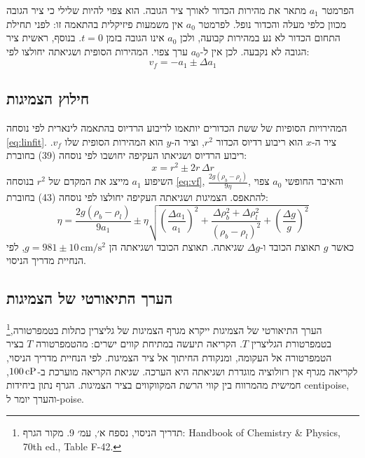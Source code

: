 \documentclass[10pt,a4paper]{article}
\makeatletter
\newcommand{\textenglish}[1]{\foreignlanguage{english}{#1}}
\newif\iffirstblue \firstbluetrue
\DeclareRobustCommand{\added}[1]{\ifx\@captype\@undefined\iffirstblue\global\firstbluefalse\hypertarget{firstblue}{}\label{firstblue}\fi\fi\textcolor{addedblue}{#1}}
\newcommand{\U}[1]{\,\mathrm{#1}}
\makeatother
\begin{document}
הפרמטר $a_1$ מתאר את מהירות הכדור לאורך ציר הגובה. הוא צפוי להיות שלילי כי ציר הגובה מכוון כלפי מעלה והכדור נופל. לפרמטר $a_0$ אין משמעות פיזיקלית בהתאמה זו: לפני תחילת התחום הכדור לא נע במהירות קבועה, ולכן $a_0$ אינו הגובה בזמן $t=0$. בנוסף, ראשית ציר הגובה לא נקבעה. לכן אין ל-$a_0$ ערך צפוי. המהירות הסופית ושגיאתה יחולצו לפי:
\begin{equation}\label{eq:vffit}
v_f = -a_1 \pm \Delta a_1
\end{equation}

\subsection*{חילוץ הצמיגות}
המהירויות הסופיות של ששת הכדורים יותאמו לריבוע הרדיוס בהתאמה לינארית לפי נוסחה \eqref{eq:linfit}. ציר ה-$x$ הוא ריבוע רדיוס הכדור $r^2$, וציר ה-$y$ הוא המהירות הסופית שלו $v_f$. ריבוע הרדיוס ושגיאתו העקיפה יחושבו לפי נוסחה (39) בחוברת:
\begin{equation}\label{eq:dr2}
x = r^2 \pm 2r\,\Delta r
\end{equation}
השיפוע $a_1$ מייצג את המקדם של $r^2$ בנוסחה \eqref{eq:vf}, $\frac{2g(\rho_b-\rho_l)}{9\eta}$, והאיבר החופשי $a_0$ צפוי להתאפס. הצמיגות ושגיאתה העקיפה יחולצו לפי נוסחה (43) בחוברת:
\begin{equation}\label{eq:eta}
\eta = \frac{2g(\rho_b-\rho_l)}{9a_1} \pm \eta\sqrt{\left(\frac{\Delta a_1}{a_1}\right)^2 + \frac{\Delta\rho_b^2+\Delta\rho_l^2}{(\rho_b-\rho_l)^2} + \left(\frac{\Delta g}{g}\right)^2}
\end{equation}
כאשר $g$ תאוצת הכובד ו-$\Delta g$ שגיאתה.
תאוצת הכובד ושגיאתה הן $g = 981 \pm 10\U{cm/s^2}$, לפי הנחיית מדריך הניסוי.

\subsection*{הערך התיאורטי של הצמיגות}
הערך התיאורטי של הצמיגות ייקרא מגרף הצמיגות של גליצרין כתלות בטמפרטורה,\footnote{תדריך הניסוי, נספח א׳, עמ׳ 9. מקור הגרף: \textenglish{Handbook of Chemistry \& Physics, 70th ed., Table F-42}.} בטמפרטורת הגליצרין $T$. \added{הקריאה תיעשה במתיחת קווים ישרים: מהטמפרטורה $T$ בציר הטמפרטורה אל העקומה, ומנקודת החיתוך אל ציר הצמיגות. לפי הנחיית מדריך הניסוי, לקריאה מגרף אין רזולוציה מוגדרת ושגיאתה היא הערכה. שגיאת הקריאה מוערכת ב-$\ReadErrCP\U{cP}$, חמישית מהמרווח בין קווי הרשת המקווקווים בציר הצמיגות.} הגרף נתון ביחידות \textenglish{centipoise}, והערך יומר ל-\textenglish{poise}.
\end{document}
